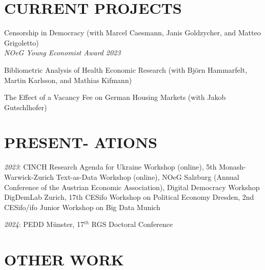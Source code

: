\documentclass[margin, 12pt]{res} %
\begin{document}
\begin{resume}
		\section{CURRENT PROJECTS}
		
		Censorship in Democracy (with Marcel Caesmann, Janis Goldzycher, and Matteo Grigoletto) \\
		{\sl NOeG Young Economist Award 2023}
		
		Bibliometric Analysis of Health Economic Research (with Björn Hammarfelt, Martin Karlsson, and Mathias Kifmann)
		
		The Effect of a Vacancy Fee on German Housing Markets (with Jakob Gutschlhofer)
		
		
		
		\section{PRESENT- ATIONS}
		{\sl2023}: CINCH Research Agenda for Ukraine Workshop (online), 5th Monash-Warwick-Zurich Text-as-Data Workshop (online), NOeG Salzburg (Annual Conference of the Austrian Economic Association), Digital Democracy Workshop DigDemLab Zurich, 17th CESifo Workshop on Political Economy Dresden, 2nd CESifo/ifo Junior Workshop on Big Data Munich
		
		{\sl2024}: PEDD Münster, 17$^{th}$ RGS Doctoral Conference
		
		\section{OTHER WORK}
		
		

\end{resume}
\end{document}
